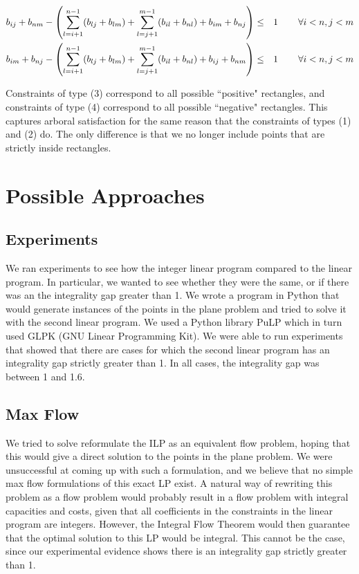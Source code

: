 \documentclass[11pt]{article}
\begin{document}
\begin{align}
b_{ij} + b_{nm} - \left(\sum_{l=i+1}^{n-1} (b_{lj}+b_{lm}) + \sum_{l=j+1}^{m-1} (b_{il} + b_{nl}) + b_{im} + b_{nj} \right) &\leq& 1 & \hspace{.3in} \forall i<n, j<m \\
b_{im} + b_{nj} - \left(\sum_{l=i+1}^{n-1} (b_{lj}+b_{lm}) + \sum_{l=j+1}^{m-1} (b_{il} + b_{nl}) + b_{ij} + b_{nm} \right) &\leq& 1 & \hspace{.3in} \forall i<n, j<m
\end{align}

Constraints of type (3) correspond to all possible ``positive" rectangles, and constraints of type (4) correspond to all possible ``negative" rectangles. This captures arboral satisfaction for the same reason that the constraints of types (1) and (2) do. The only difference is that we no longer include points that are strictly inside rectangles.

\section{Possible Approaches}

\subsection{Experiments}

We ran experiments to see how the integer linear program compared to the linear program. In particular, we wanted to see whether they were the same, or if there was an the integrality gap greater than 1. We wrote a program in Python that would generate instances of the points in the plane problem and tried to solve it with the second linear program. We used a Python library PuLP which in turn used GLPK (GNU Linear Programming Kit). We were able to run experiments that showed that there are cases for which the second linear program has an integrality gap strictly greater than 1. In all cases, the integrality gap was between 1 and 1.6.

\subsection{Max Flow}

We tried to solve reformulate the ILP as an equivalent flow problem, hoping that this would give a direct solution to the points in the plane problem. We were unsuccessful at coming up with such a formulation, and we believe that no simple max flow formulations of this exact LP exist. A natural way of rewriting this problem as a flow problem would probably result in a flow problem with integral capacities and costs, given that all coefficients in the constraints in the linear program are integers. However, the Integral Flow Theorem would then guarantee that the optimal solution to this LP would be integral. This cannot be the case, since our experimental evidence shows there is an integrality gap strictly greater than 1.
\end{document}
